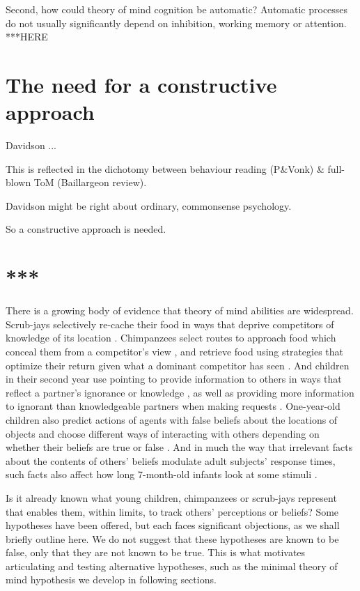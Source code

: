 \documentclass[12pt,\papersize]{extarticle}
\begin{document}
Second, how could theory of mind cognition be automatic?
Automatic processes do not usually significantly depend on inhibition, working memory or attention.
***HERE

\section{The need for a constructive approach}
Davidson ...

This is reflected in the dichotomy between behaviour reading (P&Vonk) \& full-blown ToM (Baillargeon review).

Davidson might be right about ordinary, commonsense psychology.

So a constructive approach is needed.


\section{***}




There is a growing body of evidence that theory of mind abilities are widespread.  Scrub-jays selectively re-cache their food in ways that deprive competitors of knowledge of its location \citep[]{Clayton:2007fh}.  Chimpanzees select routes to approach food which conceal them from a competitor’s view \citep[]{en_1546}, and retrieve food using strategies that optimize their return given what a dominant competitor has seen \citep[]{en_1545}.  And children in their second year use pointing to provide information to others \citep[]{en_1093} in ways that reflect a partner’s ignorance or knowledge \citep[]{en_1699}, as well as providing more information to ignorant than knowledgeable partners when making requests \citep[]{en_1140}.  One-year-old children also predict actions of agents with false beliefs about the locations of objects \citep[]{en_1092, en_1208} and choose different ways of interacting with others depending on whether their beliefs are true or false \citep[]{en_1783,Knudsen:2011fk,southgate:2010fb}.  And in much the way that irrelevant facts about the contents of others’ beliefs modulate adult subjects’ response times, such facts also affect how long 7-month-old infants look at some stimuli \citep[]{kovacs_social_2010}.

Is it already known what young children, chimpanzees or scrub-jays represent that enables them, within limits, to track others’ perceptions or beliefs?   
Some hypotheses have been offered, 
but each faces significant objections, as we shall briefly outline here.
We do not suggest that these hypotheses are known to be false, only that they are not known to be true.
This is what motivates articulating and testing  alternative hypotheses, such as the minimal theory of mind hypothesis we develop in following sections.
\end{document}
